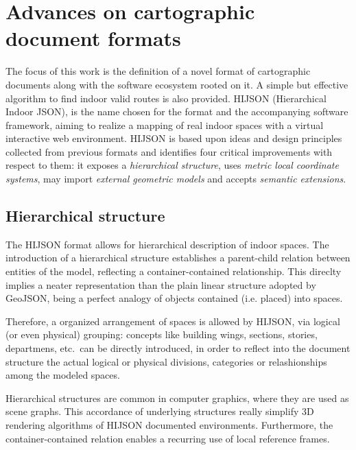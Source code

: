 
\section{Advances on cartographic\\ document formats}\label{advances-on-cartographic-document-format}
\label{advances}

The focus of this work is the definition of a novel format of cartographic
documents along with the software ecosystem rooted on it. A simple but
effective algorithm to find indoor valid routes is also provided.  {HIJSON}
({H}ierarchical {I}ndoor {JSON}),  is the name chosen
for the format and the accompanying software framework, aiming to realize a
mapping of real indoor spaces with a virtual interactive web environment.
HIJSON is based upon ideas and design principles collected from previous
formats and identifies four critical improvements with respect to them: it
exposes a \emph{hierarchical structure}, uses \emph{metric local coordinate
systems}, may import \emph{external geometric models} and accepts \emph{semantic
extensions}. 

\subsection{Hierarchical structure}\label{hierarchical-structure}

The HIJSON format allows for hierarchical description of indoor spaces. The
introduction of a hierarchical structure establishes a parent-child relation
between entities of the model, reflecting a container-contained relationship.
This direclty implies a neater representation than the plain linear structure
adopted by GeoJSON, being a perfect analogy of objects contained (i.e.
placed) into spaces.

Therefore, a  organized arrangement of spaces is allowed by HIJSON, via logical (or even
physical) grouping: concepts like building wings, sections, stories,
departmens, etc.~can be directly introduced, in order to reflect into the document structure
the actual logical or physical divisions, categories or relashionships among the modeled spaces.

Hierarchical structures are common in computer graphics, where they are used as
scene graphs. This accordance of underlying structures really simplify 3D
rendering algorithms of HIJSON documented environments.
Furthermore, the container-contained relation enables a recurring use of local reference frames.

